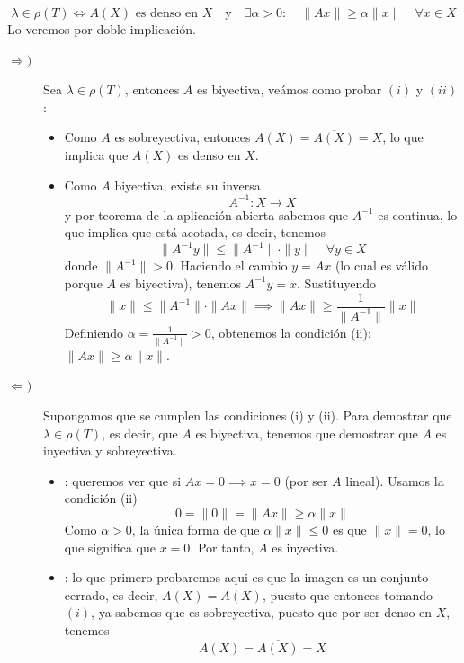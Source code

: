 \begin{ejercicio}
    $$\lambda \in \rho(T) \iff A(X) \text{ es denso en } X \quad \text{y} \quad \exists \alpha> 0 : \quad \|Ax\| \geq \alpha\|x\| \quad \forall x \in X$$
    Lo veremos por doble implicación.
    \begin{description}
        \item[$\Longrightarrow)$] Sea $\lambda \in \rho(T)$, entonces $A$ es biyectiva, veámos como probar $(i)$ y $(ii)$:
        \begin{itemize}
            \item[$(i)$] Como $A$ es sobreyectiva, entonces $A(X) =\overline{A(X)}= X$, lo que implica que $A(X)$ es denso en $X$.
            \item[$(ii)$] Como $A$ biyectiva, existe su inversa
            \begin{equation*}
                A^{-1} : X \longrightarrow X
            \end{equation*}
            y por teorema de la aplicación abierta sabemos que $A^{-1}$ es continua, lo que implica que está acotada, es decir, tenemos
            $$\|A^{-1}y\| \leq \|A^{-1}\| \cdot \|y\|\quad \forall y \in X$$
            donde $\|A^{-1}\|>0$. Haciendo el cambio $y = Ax$ (lo cual es válido porque $A$ es biyectiva), tenemos $A^{-1}y = x$. Sustituyendo
            $$\|x\| \leq \|A^{-1}\| \cdot \|Ax\| \implies \|Ax\| \geq \frac{1}{\|A^{-1}\|} \|x\|$$
            Definiendo $\alpha = \frac{1}{\|A^{-1}\|} > 0$, obtenemos la condición (ii): $\|Ax\| \geq \alpha \|x\|$.
        \end{itemize}
        \item[$\Longleftarrow)$] Supongamos que se cumplen las condiciones (i) y (ii). Para demostrar que $\lambda \in \rho(T)$, es decir, que $A$ es biyectiva, tenemos que demostrar que $A$ es inyectiva y sobreyectiva.
        \begin{itemize}
            \item {}: queremos ver que si $Ax = 0 \implies x = 0$ (por ser $A$ lineal). Usamos la condición (ii)
            $$0 = \|0\| = \|Ax\| \geq \alpha \|x\|$$
            Como $\alpha > 0$, la única forma de que $\alpha \|x\| \leq 0$ es que $\|x\| = 0$, lo que significa que $x = 0$. Por tanto, $A$ es inyectiva.
            \item {}: lo que primero probaremos aqui es que la imagen es un conjunto cerrado, es decir, $A(X)=\overline{A(X)}$, puesto que entonces tomando $(i)$, ya sabemos que es sobreyectiva, puesto que por ser denso en $X$, tenemos
            $$ A(X)=\overline{A(X)}=X$$

\end{itemize}
\end{description}
\end{ejercicio}
